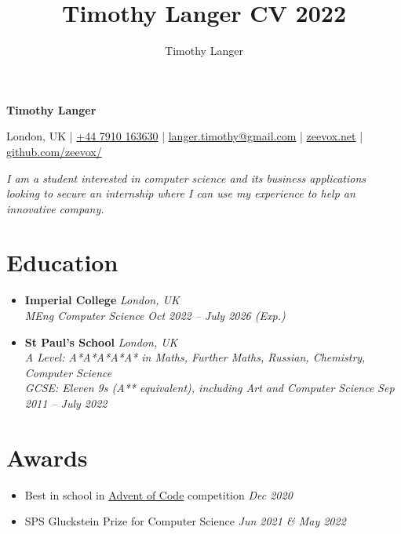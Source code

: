 \documentclass[11pt,twoside,a4paper]{book}
\author{Timothy Langer}
\title{Timothy Langer CV 2022}
\newcommand{\cvdate}[1] {\hfill {\color{gray} \mdseries \slshape \normalsize #1}}
\begin{document}
{\huge \bfseries Timothy Langer}

\vspace{1.5ex}

London, UK | \href{tel:+447910163630}{+44 7910 163630} | \href{mailto:langer.timothy@gmail.com}{langer.timothy@gmail.com} | \href{https://zeevox.net}{zeevox.net} | \href{https://github.com/zeevox/}{github.com/zeevox/}

\vspace{1ex}

\textsl{I am a student interested in computer science and its business applications looking to secure an internship where I can use my experience to help an innovative company.}

\vspace{1ex}

\section*{Education}

\begin{itemize}
  \item \textbf{Imperial College} \cvdate{London, UK} \\
    {\small \textit{MEng Computer Science}}
    \cvdate{\small Oct 2022 -- July 2026 (Exp.)}
  \item \textbf{St Paul's School} \cvdate{London, UK} \\ 
    {\small \textit{A Level: A*A*A*A*A* in Maths, Further Maths, Russian, Chemistry, Computer Science} \\
    \textit{GCSE: Eleven 9s (A** equivalent), including Art and Computer Science}} 
    \cvdate{\small Sep 2011 -- July 2022} 
\end{itemize}

\section*{Awards}

\begin{itemize}
  \itemsep-0.2em
  \item Best in school in \href{https://adventofcode.com/2020/about}{Advent of Code} competition \cvdate{Dec 2020}
  \item SPS Gluckstein Prize for Computer Science \cvdate{Jun 2021 \& May 2022}
\end{itemize}
\end{document}
